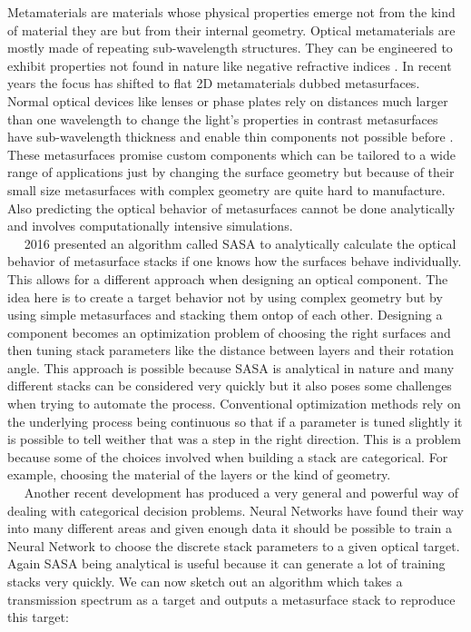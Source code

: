 Metamaterials are materials whose physical properties emerge not from the kind of material they are but from their internal geometry. Optical metamaterials are mostly made of repeating sub-wavelength structures. They can be engineered to exhibit properties not found in nature like negative refractive indices \cite{Shelby2001}. In recent years the focus has shifted to flat 2D metamaterials dubbed metasurfaces. Normal optical devices like lenses or phase plates rely on distances much larger than one wavelength to change the light's properties in contrast metasurfaces have sub-wavelength thickness and enable thin components not possible before \cite{Yu2014}.  These metasurfaces promise custom components which can be tailored to a wide range of applications just by changing the surface geometry
but because of their small size metasurfaces with complex geometry are quite hard to manufacture. Also predicting the optical behavior of metasurfaces cannot be done analytically and involves computationally intensive simulations.
\\

$\quad$
2016 \cite{Menzel2016} presented an algorithm called SASA to analytically calculate the optical behavior of metasurface stacks if one knows how the surfaces behave individually. This allows for a different approach when designing an optical component. The idea here is to create a target behavior not by using complex geometry but by using simple metasurfaces and stacking them ontop of each other. Designing a component becomes an optimization problem of choosing the right surfaces and then tuning stack parameters like the distance between layers and their rotation angle. This approach is possible because SASA is analytical in nature and many different stacks can be considered very quickly but it also poses some challenges when trying to automate the process. Conventional optimization methods rely on the underlying process being continuous so that if a parameter is tuned slightly it is possible to tell weither that was a step in the right direction. This is a problem because some of the choices involved when building a stack are categorical. For example, choosing the material of the layers or the kind of geometry.
\\

$\quad$
Another recent development has produced a very general and powerful way of dealing with categorical decision problems. Neural Networks have found their way into many different areas and given enough data it should be possible to train a Neural Network to choose the discrete stack parameters to a given optical target. Again SASA being analytical is useful because it can generate a lot of training stacks very quickly. We can now sketch out an algorithm which takes a transmission spectrum as a target and outputs a metasurface stack to reproduce this target:
\\
\\


